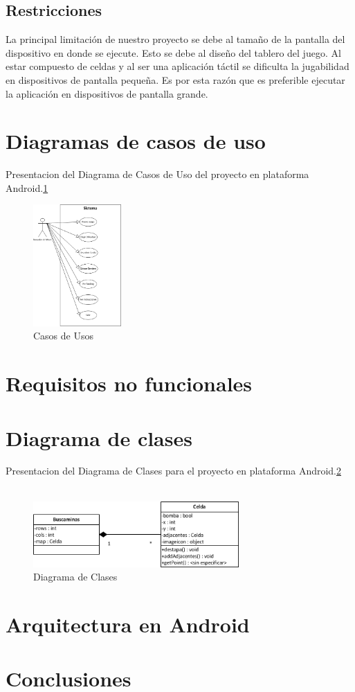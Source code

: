\documentclass[11pt]{article} %
\begin{document}
\subsection{Restricciones}
La principal limitaci\'on de nuestro proyecto se debe al tama\~no de la pantalla del dispositivo en donde se ejecute.
Esto se debe al dise\~no del tablero del juego. Al estar compuesto de celdas y al ser una aplicaci\'on t\'actil se dificulta la jugabilidad en dispositivos de pantalla peque\~na.
Es por esta raz\'on que es preferible ejecutar la aplicaci\'on en dispositivos de pantalla grande.


\section{Diagramas de casos de uso }

\begin{center}
Presentacion del Diagrama de Casos de Uso del proyecto en plataforma Android.\ref{fig:casosdeusos}

	\begin{figure}[h!]
  		\centering
    		\includegraphics[width=0.3\textwidth]{imagenes/casosdeusos.png}
  		\caption{Casos de Usos}
		\label{fig:casosdeusos}
	\end{figure}
\end{center}



\section{Requisitos no funcionales }
\section{Diagrama de clases }

\begin{center}
Presentacion del Diagrama de Clases para el proyecto en plataforma Android.\ref{fig:diagclass}
\\\
	\begin{figure}[h!]
  		\centering
    		\includegraphics[width=0.7\textwidth]{imagenes/buscamina_diagclass.png}
  		\caption{Diagrama de Clases}
		\label{fig:diagclass}
	\end{figure}
\end{center}

\section{Arquitectura en Android}
\section{Conclusiones}
\end{document}
